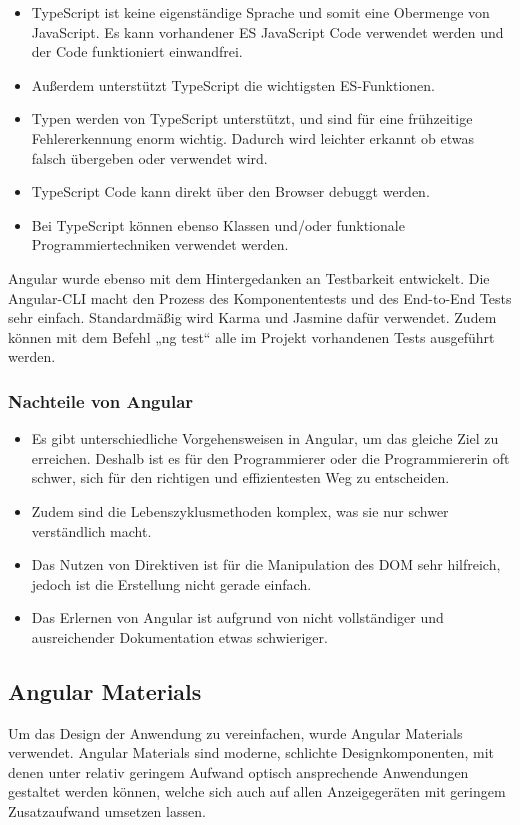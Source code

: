 \begin{itemize}
  \item TypeScript ist keine eigenständige Sprache und somit eine Obermenge von JavaScript. Es kann vorhandener ES JavaScript Code verwendet werden und der Code funktioniert einwandfrei.
  \item Außerdem unterstützt TypeScript die wichtigsten ES-Funktionen.
  \item Typen werden von TypeScript unterstützt, und sind für eine frühzeitige Fehlererkennung enorm wichtig. Dadurch wird leichter erkannt ob etwas falsch übergeben oder verwendet wird.
  \item TypeScript Code kann direkt über den Browser debuggt werden.
  \item Bei TypeScript können ebenso Klassen und/oder funktionale Programmiertechniken verwendet werden.
\end{itemize}

Angular wurde ebenso mit dem Hintergedanken an Testbarkeit entwickelt. Die Angular-CLI macht den Prozess des Komponententests und des End-to-End Tests sehr einfach. Standardmäßig wird Karma und Jasmine dafür verwendet. Zudem können mit dem Befehl „ng test“ alle im Projekt vorhandenen Tests ausgeführt werden.

\cite{VorteileAngular}

\subsubsection{Nachteile von Angular}
\begin{itemize}
  \item Es gibt unterschiedliche Vorgehensweisen in Angular, um das gleiche Ziel zu erreichen. Deshalb ist es für den Programmierer oder die Programmiererin oft schwer, sich für den richtigen und effizientesten Weg zu entscheiden.
  \item Zudem sind die Lebenszyklusmethoden komplex, was sie nur schwer verständlich macht.
  \item Das Nutzen von Direktiven ist für die Manipulation des DOM sehr hilfreich, jedoch ist die Erstellung nicht gerade einfach.
  \item Das Erlernen von Angular ist aufgrund von nicht vollständiger und ausreichender Dokumentation etwas schwieriger.
\end{itemize}
\cite{NachteileAngular}

\subsection{Angular Materials}
Um das Design der Anwendung zu vereinfachen, wurde Angular Materials verwendet. Angular Materials sind moderne, schlichte Designkomponenten, mit denen unter relativ geringem Aufwand optisch ansprechende Anwendungen gestaltet werden können, welche sich auch auf allen Anzeigegeräten mit geringem Zusatzaufwand umsetzen lassen. \cite{AngularMaterials}

